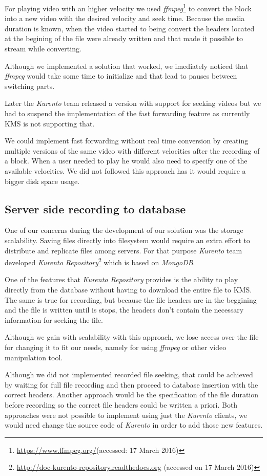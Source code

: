 	For playing video with an higher velocity we used \emph{ffmpeg}\footnote{\url{https://www.ffmpeg.org/}(accessed: 17 March 2016)} to convert the block into a new video with the desired velocity and seek time. Because the media duration is known, when the video started to being convert the headers located at the begining of the file were already written and that made it possible to stream while converting.


	Although we implemented a solution that worked, we imediately noticed that \emph{ffmpeg} would take some time to initialize and that lead to pauses between switching parts.

	Later the \emph{Kurento} team released a version with support for seeking videos but we had to suspend the implementation of the fast forwarding feature as currently \ac{KMS} is not supporting that.

	We could implement fast forwarding without real time conversion by creating multiple versions of the same video with different velocities after the recording of a block. When a user needed to play he would also need to specify one of the available velocities. We did not followed this approach has it would require a bigger disk space usage. 

\subsection{Server side recording to database}

	One of our concerns during the development of our solution was the storage scalability. Saving files directly into filesystem would require an extra effort to distribute and replicate files among servers. For that purpose \emph{Kurento} team developed \emph{Kurento Repository}\footnote{\url{http://doc-kurento-repository.readthedocs.org} (accessed on 17 March 2016)} which is based on \emph{MongoDB}.

	One of the features that \emph{Kurento Repository} provides is the ability to play directly from the database without having to download the entire file to \ac{KMS}. The same is true for recording, but because the file headers are in the beggining and the file is written until is stops, the headers don't contain the necessary information for seeking the file.

	Although we gain with scalability with this approach, we lose access over the file for changing it to fit our needs, namely for using \emph{ffmpeg} or other video manipulation tool.

	Although we did not implemented recorded file seeking, that could be achieved by waiting for full file recording and then proceed to database insertion with the correct headers. Another approach would be the specification of the file duration before recording so the correct file headers could be written a priori. Both approaches were not possible to implement using just the \emph{Kurento} clients, we would need change the source code of \emph{Kurento} in order to add those new features.





